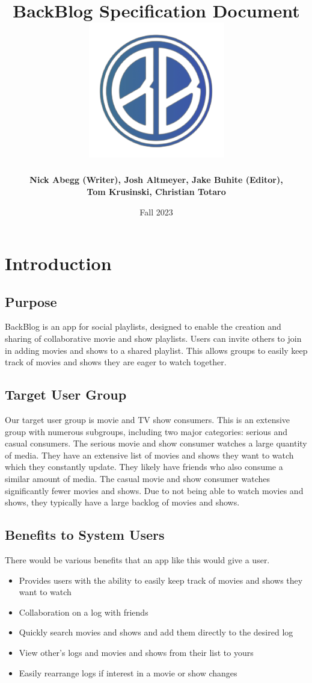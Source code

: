 \documentclass[12pt,asmart]{report}
\title{\textbf{BackBlog Specification Document} \includegraphics{Newlogo.png}}
\author{\textbf{Nick Abegg (Writer), Josh Altmeyer, Jake Buhite (Editor), }\\\textbf{Tom Krusinski, Christian Totaro}}
\date{Fall 2023}
\begin{document}
\maketitle

\tableofcontents

\chapter{Introduction}
\section{Purpose}
BackBlog is an app for social playlists, designed to enable the creation and sharing of collaborative movie and show playlists. Users can invite others to join in adding movies and shows to a shared playlist. This allows groups to easily keep track of movies and shows they are eager to watch together.
\section{Target User Group}
Our target user group is movie and TV show consumers. This is an extensive group with numerous subgroups, including two major categories: serious and casual consumers. The serious movie and show consumer watches a large quantity of media. They have an extensive list of movies and shows they want to watch which they constantly update. They likely have friends who also consume a similar amount of media. The casual movie and show consumer watches significantly fewer movies and shows. Due to not being able to watch movies and shows, they typically have a large backlog of movies and shows.
\section{Benefits to System Users}
There would be various benefits that an app like this would give a user.
\begin{itemize}
    \item Provides users with the ability to easily keep track of movies and shows they want to watch
    \item Collaboration on a log with friends
    \item Quickly search movies and shows and add them directly to the desired log
    \item View other's logs and movies and shows from their list to yours
    \item Easily rearrange logs if interest in a movie or show changes
\end{itemize}
\end{document}
